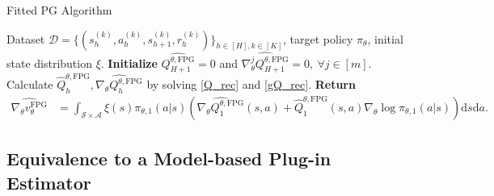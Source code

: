 \documentclass{article}
\numberwithin{equation}{section}
\begin{document}
\begin{algorithm}[htb!]
\caption{Fitted PG Algorithm}
\label{alg1}
	\begin{algorithmic}[1] 
		\Require Dataset $\mathcal{D}=\{(s^{(k)}_h,a^{(k)}_h,s^{(k)}_{h+1},r^{(k)}_h)\}_{h\in[H],k\in[K]}$, target policy $\pi_\theta$, initial state distribution $\xi$.
		\State \textbf{Initialize } $\widehat{Q_{H+1}^{\theta,\textrm{FPG}}}=0$ and $\widehat{\nabla_\theta^j Q_{H+1}^{\theta,\textrm{FPG}}}=0,\ \forall j\in[m]$.
		\State Calculate $\widehat{Q}_h^{\theta,\textrm{FPG}},\widehat{\nabla_\theta Q_h^{\theta,\textrm{FPG}}}$ by solving \eqref{Q_rec} and \eqref{gQ_rec}. 
		\EndFor
		\State \textbf{Return} 
		\begin{align*}
		    \widehat{\nabla_\theta v_\theta^{\textrm{FPG}}}&=\int_{\mathcal{S}\times\mathcal{A}} \xi(s)\pi_{\theta,1}(a\vert s)\left(\widehat{\nabla_\theta Q_1^{\theta,\textrm{FPG}}}(s,a)+\widehat{Q}_1^{\theta,\textrm{FPG}}(s,a)\nabla_\theta\log\pi_{\theta,1}(a\vert s)\right)\mathrm{d}s\mathrm{d}a.
		\end{align*}
	\end{algorithmic}
\end{algorithm}

\subsection{Equivalence to a Model-based Plug-in Estimator}
\end{document}
